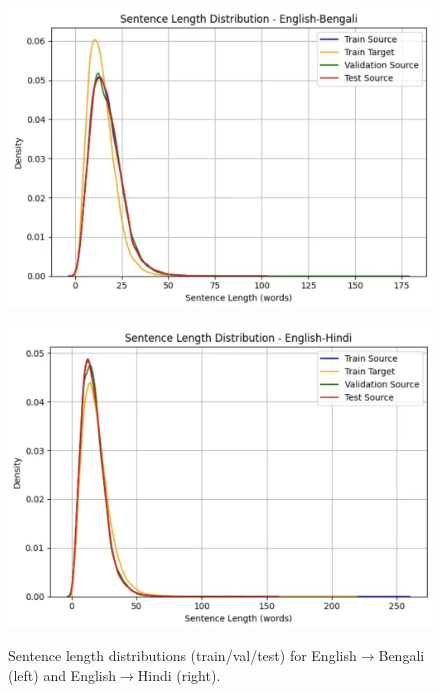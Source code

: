 \documentclass[11pt, oneside]{article}   	%
\begin{document}
\begin{figure}[h]
    \centering
    \begin{minipage}{0.48\textwidth}
        \centering
        \includegraphics[width=\linewidth]{eda/engbengali_stats.png}
        \label{fig:engbengali_kde}
    \end{minipage}\hfill
    \begin{minipage}{0.48\textwidth}
        \centering
        \includegraphics[width=\linewidth]{eda/enghindi_stats.png}
        \label{fig:enghindi_kde}
    \end{minipage}
    \caption{Sentence length distributions (train/val/test) for English$\rightarrow$Bengali (left) and English$\rightarrow$Hindi (right).}
    \label{fig:kde_plots}
\end{figure}
\end{document}
